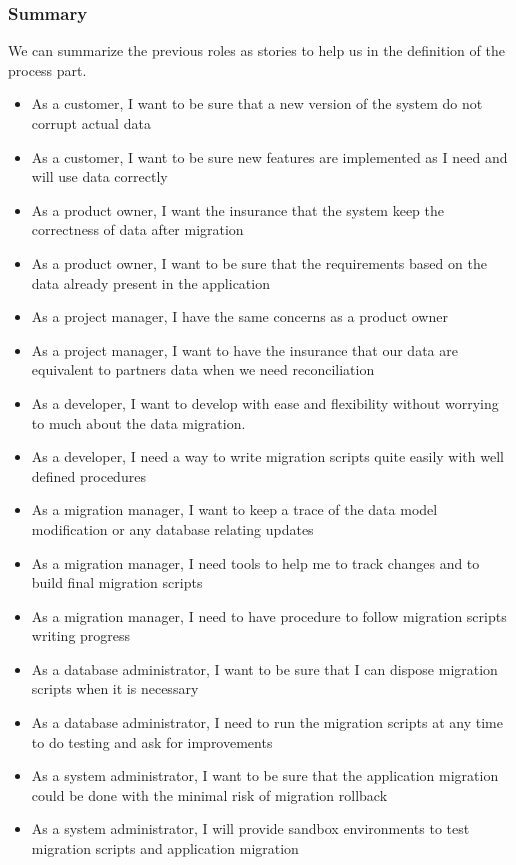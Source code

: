 \subsubsection{Summary}

We can summarize the previous roles as stories to help us in the definition of the process part.

\begin{itemize}
\renewcommand{\labelitemi}{$\bullet$}
\item As a customer, I want to be sure that a new version of the system do not corrupt actual data
\item As a customer, I want to be sure new features are implemented as I need and will use data correctly
\item As a product owner, I want the insurance that the system keep the correctness of data after migration
\item As a product owner, I want to be sure that the requirements based on the data already present in the application
\item As a project manager, I have the same concerns as a product owner
\item As a project manager, I want to have the insurance that our data are equivalent to partners data when we need reconciliation
\item As a developer, I want to develop with ease and flexibility without worrying to much about the data migration.
\item As a developer, I need a way to write migration scripts quite easily with well defined procedures
\item As a migration manager, I want to keep a trace of the data model modification or any database relating updates
\item As a migration manager, I need tools to help me to track changes and to build final migration scripts
\item As a migration manager, I need to have procedure to follow migration scripts writing progress
\item As a database administrator, I want to be sure that I can dispose migration scripts when it is necessary
\item As a database administrator, I need to run the migration scripts at any time to do testing and ask for improvements
\item As a system administrator, I want to be sure that the application migration could be done with the minimal risk of migration rollback
\item As a system administrator, I will provide sandbox environments to test migration scripts and application migration

\end{itemize}
